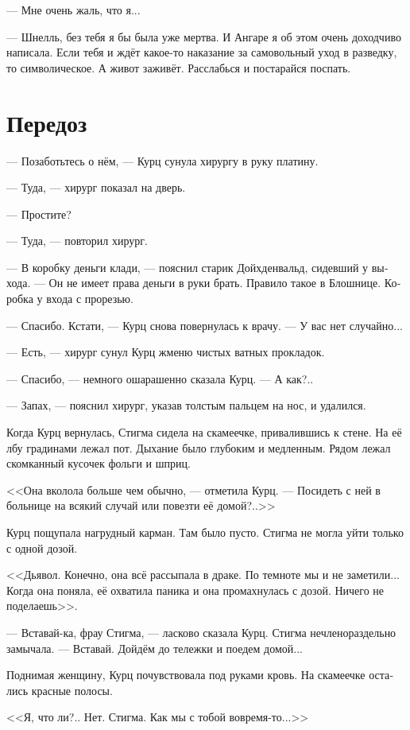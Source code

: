 \documentclass[a4paper,12pt,fleqn]{book}\usepackage{cooltooltips}\usepackage{polyglossia}\setdefaultlanguage[babelshorthands=true]{russian}\setotherlanguage{english}\defaultfontfeatures{Ligatures=TeX,Mapping=tex-text} \usepackage{xcolor}\definecolor{lightgray}{HTML}{bbbbbb}\color{lightgray}\newcommand{\ml}[3]{\textenglish{\textcolor{black}{#3}}}
\begin{document}
--- Мне очень жаль, что я...

--- Шнелль, без тебя я бы была уже мертва.
И Ангаре я об этом очень доходчиво написала.
Если тебя и ждёт какое-то наказание за самовольный уход в разведку, то символическое.
А живот заживёт.
Расслабься и постарайся поспать.

\section{Передоз}

--- Позаботьтесь о нём, --- Курц сунула хирургу в руку платину.

--- Туда, --- хирург показал на дверь.

--- Простите?

--- Туда, --- повторил хирург.

--- В коробку деньги клади, --- пояснил старик Дойхденвальд, сидевший у выхода.
--- Он не имеет права деньги в руки брать.
Правило такое в Блошнице.
Коробка у входа с прорезью.

--- Спасибо.
Кстати, --- Курц снова повернулась к врачу.
--- У вас нет случайно...

--- Есть, --- хирург сунул Курц жменю чистых ватных прокладок.

--- Спасибо, --- немного ошарашенно сказала Курц.
--- А как?..

--- Запах, --- пояснил хирург, указав толстым пальцем на нос, и удалился.

Когда Курц вернулась, Стигма сидела на скамеечке, привалившись к стене.
На её лбу градинами лежал пот.
Дыхание было глубоким и медленным.
Рядом лежал скомканный кусочек фольги и шприц.

<<Она вколола больше чем обычно, --- отметила Курц.
--- Посидеть с ней в больнице на всякий случай или повезти её домой?..>>

Курц пощупала нагрудный карман.
Там было пусто.
Стигма не могла уйти только с одной дозой.

<<Дьявол.
Конечно, она всё рассыпала в драке.
По темноте мы и не заметили...
Когда она поняла, её охватила паника и она промахнулась с дозой.
Ничего не поделаешь>>.

--- Вставай-ка, фрау Стигма, --- ласково сказала Курц.
Стигма нечленораздельно замычала.
--- Вставай.
Дойдём до тележки и поедем домой...

Поднимая женщину, Курц почувствовала под руками кровь.
На скамеечке остались красные полосы.

<<Я, что ли?..
Нет.
Стигма.
Как мы с тобой вовремя-то...>>
\end{document}
